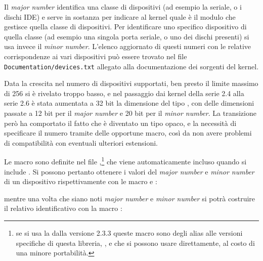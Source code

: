 Il \textit{major number} identifica una classe di dispositivi (ad esempio la
seriale, o i dischi IDE) e serve in sostanza per indicare al kernel quale è il
modulo che gestisce quella classe di dispositivi. Per identificare uno
specifico dispositivo di quella classe (ad esempio una singola porta seriale,
o uno dei dischi presenti) si usa invece il \textit{minor number}. L'elenco
aggiornato di questi numeri con le relative corrispondenze ai vari dispositivi
può essere trovato nel file \texttt{Documentation/devices.txt} allegato alla
documentazione dei sorgenti del kernel.

Data la crescita nel numero di dispositivi supportati, ben presto il limite
massimo di 256 si è rivelato troppo basso, e nel passaggio dai kernel della
serie 2.4 alla serie 2.6 è stata aumentata a 32 bit la dimensione del tipo
, con delle dimensioni passate a 12 bit per il \textit{major
  number} e 20 bit per il \textit{minor number}. La transizione però ha
comportato il fatto che  è diventato un tipo opaco, e la
necessità di specificare il numero tramite delle opportune macro, così da non
avere problemi di compatibilità con eventuali ulteriori estensioni.

Le macro sono definite nel file ,\footnote{se si
  usa la  dalla versione 2.3.3 queste macro sono degli alias alle
  versioni specifiche di questa libreria, ,
   e  che si possono usare
  direttamente, al costo di una minore portabilità.} che viene automaticamente
incluso quando si include . Si possono pertanto ottenere
i valori del \textit{major number} e \textit{minor number} di un dispositivo
rispettivamente con le macro  e :

{\centering
\vspace{3pt}
\begin{funcbox}{
} 
\end{funcbox}
}

\noindent mentre una volta che siano noti \textit{major number} e
\textit{minor number} si potrà costruire il relativo identificativo con la
macro :

{\centering
\vspace{3pt}
\begin{funcbox}{
} 
\end{funcbox}
}


